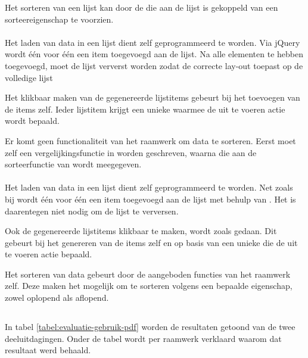 Het sorteren van een lijst kan door de  die aan de lijst is gekoppeld van een sorteereigenschap te voorzien.

\paragraph{\jqm}
Het laden van data in een lijst dient zelf geprogrammeerd te worden.
Via jQuery wordt één voor één een item toegevoegd aan de lijst.
Na alle elementen te hebben toegevoegd, moet de lijst ververst worden zodat \jqm{} de correcte lay-out toepast op de volledige lijst

Het klikbaar maken van de gegenereerde lijstitems gebeurt bij het toevoegen van de items zelf.
Ieder lijstitem krijgt een unieke  waarmee de uit te voeren actie wordt bepaald.

Er komt geen functionaliteit van het raamwerk om data te sorteren.
Eerst moet zelf een vergelijkingsfunctie in \js{} worden geschreven, waarna die aan de sorteerfunctie van \js{} wordt meegegeven.

\paragraph{\lungo}
Het laden van data in een lijst dient zelf geprogrammeerd te worden.
Net zoals bij \jqm{} wordt één voor één een item toegevoegd aan de lijst met behulp van \quo{}.
Het is daarentegen niet nodig om de lijst te verversen.

Ook de gegenereerde lijstitems klikbaar te maken, wordt zoals \jqm{} gedaan.
Dit gebeurt bij het genereren van de items zelf en op basis van een unieke  die de uit te voeren actie bepaald.

Het sorteren van data gebeurt door de aangeboden functies van het raamwerk zelf.
Deze maken het mogelijk om te sorteren volgens een bepaalde eigenschap, zowel oplopend als aflopend.



\subsection{}
\label{sec:evaluatie-gebruik-pdf}

In tabel \ref{tabel:evaluatie-gebruik-pdf} worden de resultaten getoond van de twee deeluitdagingen.
Onder de tabel wordt per raamwerk verklaard waarom dat resultaat werd behaald.

